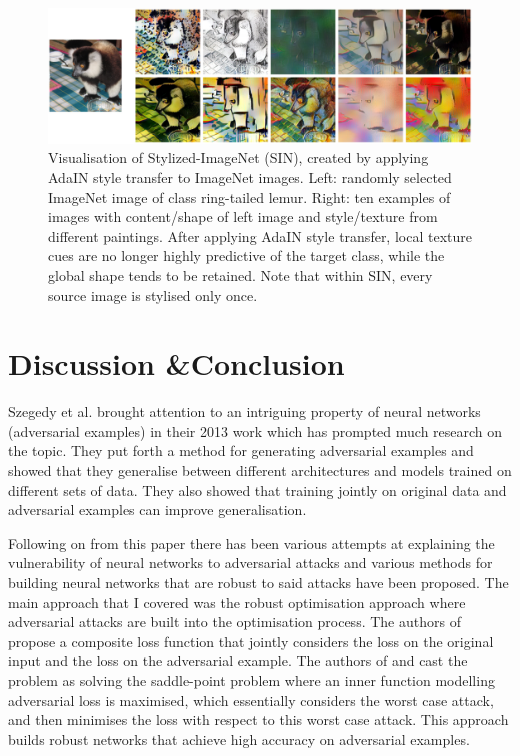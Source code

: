 \documentclass{article}
\begin{document}
\begin{figure}
    \centering
    \includegraphics[width=\linewidth]{figures/lemur-style-transfer.png}
    \caption{Visualisation of Stylized-ImageNet (SIN), created by applying AdaIN style transfer to ImageNet images. Left: randomly selected ImageNet image of class ring-tailed lemur.
Right: ten examples of images with content/shape of left image and style/texture from different paintings. After applying AdaIN style transfer, local texture cues are no longer highly predictive of the target class, while the global shape tends to be retained. Note that within SIN, every source image is stylised only once.\protect\footnotemark}
    \label{fig:lemur_style_transfer}
\end{figure}

\section{Discussion \&Conclusion}
Szegedy et al. brought attention to an intriguing property of neural networks (adversarial examples) in their 2013 work \cite{szegedy2013intriguing} which has prompted much research on the topic. They put forth a method for generating adversarial examples and showed that they generalise between different architectures and models trained on different sets of data. They also showed that training jointly on original data and adversarial examples can improve generalisation.

Following on from this paper there has been various attempts at explaining the vulnerability of neural networks to adversarial attacks and various methods for building neural networks that are robust to said attacks have been proposed. The main approach that I covered was the robust optimisation approach where adversarial attacks are built into the optimisation process. The authors of \cite{goodfellow2014explaining} propose a composite loss function that jointly considers the loss on the original input and the loss on the adversarial example. The authors of \cite{madry2017towards} and \cite{schmidt2018adversarially} cast the problem as solving the saddle-point problem where an inner function modelling adversarial loss is maximised, which essentially considers the worst case attack, and then minimises the loss with respect to this worst case attack. This approach builds robust networks that achieve high accuracy on adversarial examples.
\end{document}
